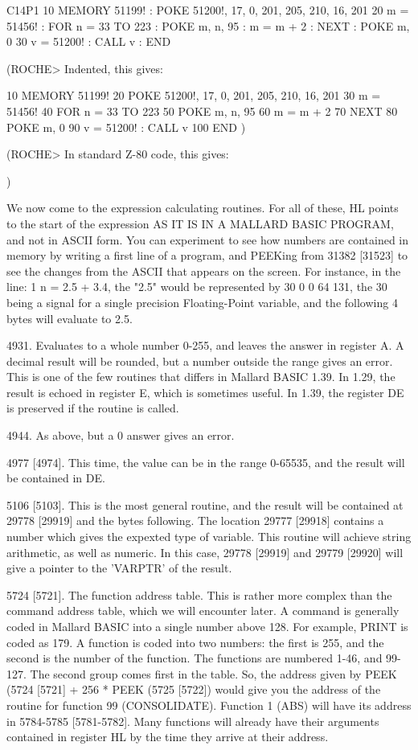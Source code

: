         C14P1
        10 MEMORY 51199! : POKE 51200!, 17, 0, 201, 205, 210, 16, 201
        20 m = 51456! : FOR n = 33 TO 223 : POKE m, n, 95 : m = m + 2 : NEXT : 
POKE m, 0
        30 v = 51200! : CALL v : END

(ROCHE> Indented, this gives:

        10 MEMORY 51199!
        20 POKE 51200!, 17, 0, 201, 205, 210, 16, 201
        30 m = 51456!
        40 FOR n = 33 TO 223
        50     POKE m, n, 95
        60     m = m + 2
        70 NEXT
        80 POKE m, 0
        90 v = 51200! : CALL v
        100 END
)

(ROCHE> In standard Z-80 code, this gives:

$$$$
)

We  now  come  to the expression calculating routines. For all  of  these,  HL 
points to the start of the expression AS IT IS IN A MALLARD BASIC PROGRAM, and 
not  in  ASCII form. You can experiment to see how numbers  are  contained  in 
memory by writing a first line of a program, and PEEKing from 31382 [31523] to 
see  the changes from the ASCII that appears on the screen. For  instance,  in 
the  line: 1 n = 2.5 + 3.4, the "2.5" would be represented by 30 0 0  64  131, 
the 30 being a signal for a single precision Floating-Point variable, and  the 
following 4 bytes will evaluate to 2.5.

4931. Evaluates to a whole number 0-255, and leaves the answer in register  A. 
A  decimal  result will be rounded, but a number outside the  range  gives  an 
error. This is one of the few routines that differs in Mallard BASIC 1.39.  In 
1.29, the result is echoed in register E, which is sometimes useful. In  1.39, 
the register DE is preserved if the routine is called.

4944. As above, but a 0 answer gives an error.

4977 [4974]. This time, the value can be in the range 0-65535, and the  result 
will be contained in DE.

5106  [5103].  This  is  the most general routine,  and  the  result  will  be 
contained at 29778 [29919] and the bytes following. The location 29777 [29918] 
contains a number which gives the expexted type of variable. This routine will 
achieve string arithmetic, as well as numeric. In this case, 29778 [29919] and 
29779 [29920] will give a pointer to the 'VARPTR' of the result.

5724 [5721]. The function address table. This is rather more complex than  the 
command  address table, which we will encounter later. A command is  generally 
coded  in Mallard BASIC into a single number above 128. For example, PRINT  is 
coded as 179. A function is coded into two numbers: the first is 255, and  the 
second is the number of the function. The functions are numbered 1-46, and 99-
127. The second group comes first in the table. So, the address given by  PEEK 
(5724  [5721]  + 256 * PEEK (5725 [5722]) would give you the  address  of  the 
routine for function 99 (CONSOLIDATE). Function 1 (ABS) will have its  address 
in  5784-5785  [5781-5782]. Many functions will already have  their  arguments 
contained in register HL by the time they arrive at their address.

